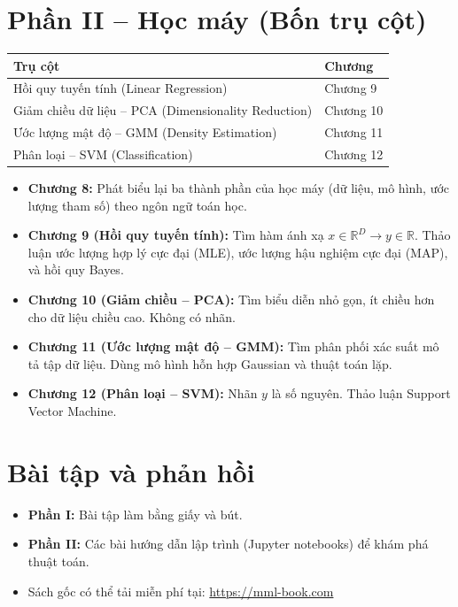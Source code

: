 \documentclass[12pt,a4paper]{article}
\begin{document}
\section{Phần II -- Học máy (Bốn trụ cột)}

\begin{center}
\begin{tabular}{|l|l|}
\hline
\textbf{Trụ cột} & \textbf{Chương} \\
\hline
Hồi quy tuyến tính (Linear Regression) & Chương 9 \\
Giảm chiều dữ liệu -- PCA (Dimensionality Reduction) & Chương 10 \\
Ước lượng mật độ -- GMM (Density Estimation) & Chương 11 \\
Phân loại -- SVM (Classification) & Chương 12 \\
\hline
\end{tabular}
\end{center}

\begin{itemize}
  \item \textbf{Chương 8:} Phát biểu lại ba thành phần của học máy (dữ liệu, mô hình, ước lượng tham số) theo ngôn ngữ toán học.
  \item \textbf{Chương 9 (Hồi quy tuyến tính):} Tìm hàm ánh xạ $x \in \mathbb{R}^D \to y \in \mathbb{R}$. Thảo luận ước lượng hợp lý cực đại (MLE), ước lượng hậu nghiệm cực đại (MAP), và hồi quy Bayes.
  \item \textbf{Chương 10 (Giảm chiều -- PCA):} Tìm biểu diễn nhỏ gọn, ít chiều hơn cho dữ liệu chiều cao. Không có nhãn.
  \item \textbf{Chương 11 (Ước lượng mật độ -- GMM):} Tìm phân phối xác suất mô tả tập dữ liệu. Dùng mô hình hỗn hợp Gaussian và thuật toán lặp.
  \item \textbf{Chương 12 (Phân loại -- SVM):} Nhãn $y$ là số nguyên. Thảo luận Support Vector Machine.
\end{itemize}

\section{Bài tập và phản hồi}

\begin{itemize}
  \item \textbf{Phần I:} Bài tập làm bằng giấy và bút.
  \item \textbf{Phần II:} Các bài hướng dẫn lập trình (Jupyter notebooks) để khám phá thuật toán.
  \item Sách gốc có thể tải miễn phí tại: \url{https://mml-book.com}
\end{itemize}
\end{document}
